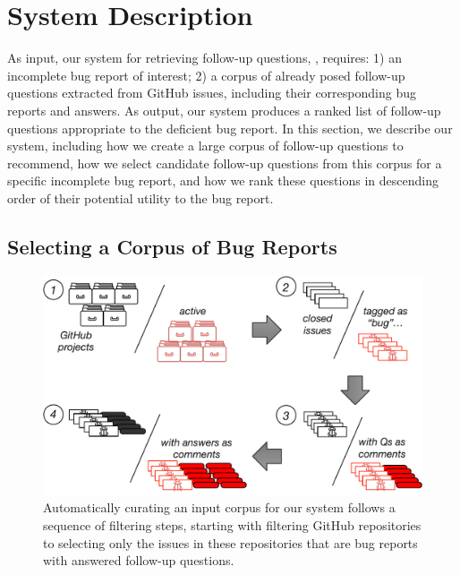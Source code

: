 \section{System Description}

As input, our system for retrieving follow-up questions, \evpi, requires: 1) an incomplete bug
report of interest; 2) a corpus of already posed follow-up questions extracted
from GitHub issues, including their corresponding bug reports and answers. As output, our system
produces a ranked list of follow-up questions appropriate to the deficient bug report.
In this section, we describe our system, including how we create
a large corpus of follow-up questions to recommend, how we select candidate follow-up questions from
this corpus for a specific incomplete bug report, and how we rank these questions in descending order of
their potential utility to the bug report.

\subsection{Selecting a Corpus of Bug Reports}


\begin{figure}[t]
\centering
\includegraphics[width=0.99\linewidth]{figures/pipeline.pdf}
\caption{Automatically curating an input corpus for our system follows a sequence of filtering steps, starting with filtering
GitHub repositories to selecting only the issues in these repositories that are bug reports with answered follow-up questions.}
\label{fig:pipeline}
\end{figure}

